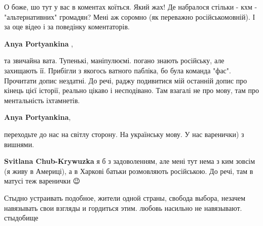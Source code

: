 \begin{itemize}
О боже, шо тут у вас в коментах коїться. Який жах! Де набралося стільки - кхм -
"альтернативних" громадян? Мені аж соромно (як переважно російськомовній). І за
оце відео і за поведінку коментаторів.

\begin{itemize}
 
\textbf{Anya Portyankina} , 

та звичайна вата. Тупенькі, маніпулюємі. погано знають російську, але захищають
її. Прибігли з якогось ватного пабліка, бо була команда "фас". Прочитати допис
нездатні. До речі, раджу подивитися мій останній допис про кінець цієї історії,
реально цікаво і несподівано. Там взагалі не про мову, там про ментальність
іхтамнетів.

 
\textbf{Anya Portyankina}, 

переходьте до нас на світлу сторону. На українську мову. У нас варенички) з
вишнями.


 
\textbf{Svitlana Chub-Krywuzka} я б з задоволенням, але мені тут нема з ким
зовсім (я живу в Америці), а в Харкові батьки розмовляють російською. До речі,
там в матусі теж варенички 😉
\end{itemize}

 

Стыдно устраивать подобное, жители одной страны, свобода выбора, незачем
навязывать свои взгляды и гордиться этим. любовь насильно не
навязывают. стыдобище


\end{itemize}
